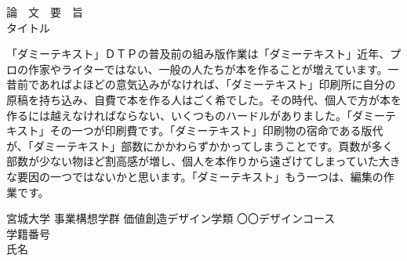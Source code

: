 \begin{center}
  {\Large
    論　文　要　旨\\
    \vspace{2\zh}
    タイトル
    \vspace{2\zh}
  }
\end{center}

{\normalfont
  「ダミーテキスト」ＤＴＰの普及前の組み版作業は「ダミーテキスト」近年、プロの作家やライターではない、一般の人たちが本を作ることが増えています。一昔前であればよほどの意気込みがなければ、「ダミーテキスト」印刷所に自分の原稿を持ち込み、自費で本を作る人はごく希でした。その時代、個人で方が本を作るには越えなければならない、いくつものハードルがありました。「ダミーテキスト」その一つが印刷費です。「ダミーテキスト」印刷物の宿命である版代が、「ダミーテキスト」部数にかかわらずかかってしまうことです。頁数が多く部数が少ない物ほど割高感が増し、個人を本作りから遠ざけてしまっていた大きな要因の一つではないかと思います。「ダミーテキスト」もう一つは、編集の作業です。
}

\vspace{3\zh}

\begin{flushright}
  宮城大学 事業構想学群 価値創造デザイン学類 〇〇デザインコース\\
  学籍番号\\
  氏名\\
\end{flushright}
